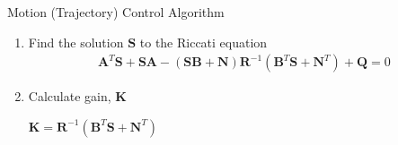 \documentclass[final]{beamer}
\newlength{\onecolwid}
\begin{document}
\begin{frame}[t]
\begin{columns}[t]
\begin{column}{\onecolwid}
\begin{block}{Motion (Trajectory) Control Algorithm}
\begin{enumerate}
\begin{center}
    \end{center}
    \vskip -1cm
    to minimize the quadratic cost function:
    \begin{align*}
        J(\mathbf{u}) = \int_0^\infty (\mathbf{x}^T\mathbf{Q}\mathbf{x} + \mathbf{u}^T\mathbf{R}\mathbf{u} + 2\mathbf{x}^T\mathbf{N}\mathbf{u})\mathrm{dt}
    \end{align*}
    \item Find the solution $\mathbf{S}$ to the Riccati equation
    \begin{align*}
        \mathbf{A}^T\mathbf{S}+\mathbf{SA}-(\mathbf{SB}+\mathbf{N})\mathbf{R}^{-1}(\mathbf{B}^T\mathbf{S}+\mathbf{N}^T)+\mathbf{Q}=0
    \end{align*}    
    \item Calculate gain, $\mathbf{K}$
    \begin{center}
        $\mathbf{K}=\mathbf{R}^{-1}(\mathbf{B}^T\mathbf{S}+\mathbf{N}^T)$
    \end{center}
\end{enumerate}

\end{block}



\end{column}
\end{columns}
\end{frame}
\end{document}
